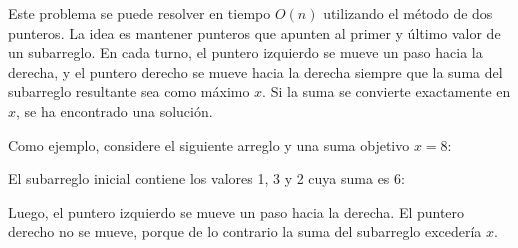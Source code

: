 Este problema se puede resolver en
tiempo $O(n)$ utilizando el método de dos punteros.
La idea es mantener punteros que apunten al
primer y último valor de un subarreglo.
En cada turno, el puntero izquierdo se mueve un paso
hacia la derecha, y el puntero derecho se mueve hacia la derecha
siempre que la suma del subarreglo resultante sea como máximo $x$.
Si la suma se convierte exactamente en $x$,
se ha encontrado una solución.

Como ejemplo, considere el siguiente arreglo
y una suma objetivo $x=8$:
\begin{center}
\end{center}

El subarreglo inicial contiene los valores
1, 3 y 2 cuya suma es 6:

\begin{center}
\end{center}

Luego, el puntero izquierdo se mueve un paso hacia la derecha.
El puntero derecho no se mueve, porque de lo contrario
la suma del subarreglo excedería $x$.

\begin{center}
\end{center}

